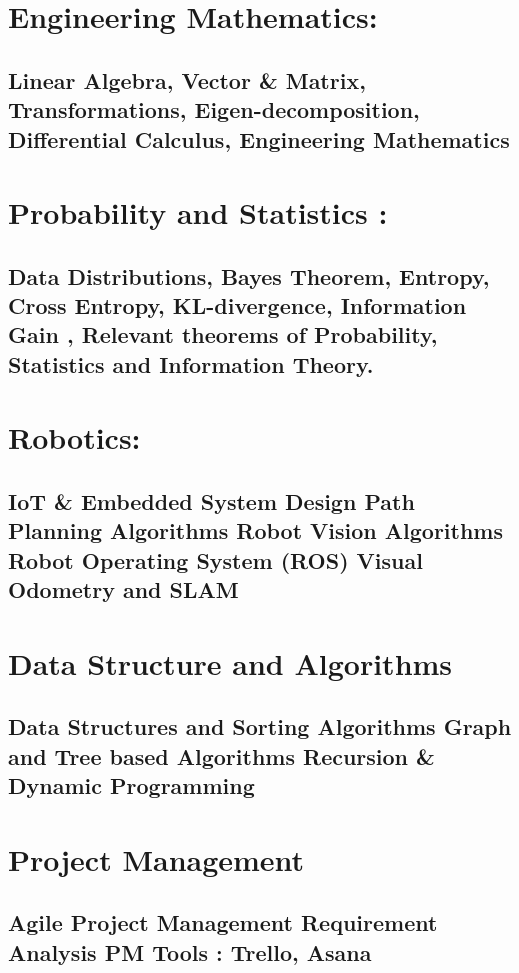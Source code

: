 \documentclass[letterpaper]{twentysecondcv} %
\begin{document}
{\section{\large Engineering Mathematics:}\subsection{\small Linear Algebra, Vector \& Matrix, Transformations, Eigen-decomposition, Differential Calculus, Engineering Mathematics}

\section{\large Probability and Statistics :}\subsection{\small Data Distributions, Bayes Theorem, Entropy, Cross Entropy, KL-divergence, Information Gain , Relevant theorems of Probability, Statistics and Information Theory.}

\section{\large Robotics:}\subsection{\small  
\textbf{IoT \& Embedded System Design} 
\newline Path Planning Algorithms 
\newline Robot Vision Algorithms 
\newline Robot Operating System \textbf{(ROS)}
\newline \textbf{Visual Odometry and SLAM}}

\section{\large Data Structure and Algorithms  }\subsection {\small Data Structures and Sorting Algorithms \newline Graph and Tree based Algorithms \newline Recursion \& Dynamic Programming }

\section{\large Project Management} \subsection{\small Agile Project Management \newline Requirement Analysis \newline PM Tools : Trello, Asana}

}
\end{document}
